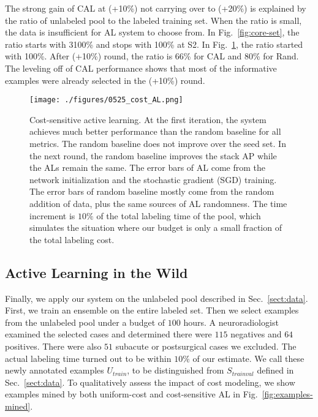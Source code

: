 \documentclass{llncs}
\begin{document}
The strong gain of CAL at (+10\%) not carrying over to (+20\%) is explained by the ratio of unlabeled pool to the labeled training set. When the ratio is small, the data is insufficient for AL system to choose from. In Fig.~\ref{fig:core-set}, the ratio starts with 3100\% and stops with 100\% at S2. In Fig.~\ref{fig:cost-sensitive}, the ratio started with 100\%. After (+10\%) round, the ratio is 66\% for CAL and 80\% for Rand. The leveling off of CAL performance shows that most of the informative examples were already selected in the (+10\%) round. 


\begin{figure}[t]
    \centering
    \texttt{[image: ./figures/0525\_cost\_AL.png]}
    \vspace*{-0.3cm}
    \caption{Cost-sensitive active learning. At the first iteration, the system achieves much better performance than the random baseline for all metrics. The random baseline does not improve over the seed set. In the next round, the random baseline improves the stack AP while the ALs remain the same. The error bars of AL come from the network initialization and the stochastic gradient (SGD) training. The error bars of random baseline mostly come from the random addition of data, plus the same sources of AL randomness. The time increment is $10\%$ of the total labeling time of the pool, which simulates the situation where our budget is only a small fraction of the total labeling cost.}
    \label{fig:cost-sensitive}
    \vspace*{-0.05cm}
\end{figure}

\subsection{Active Learning in the Wild}
\vspace*{-0.05cm}

Finally, we apply our system on the unlabeled pool described in Sec.~\ref{sect:data}. First, we train an ensemble on the entire labeled set. Then we select examples from the unlabeled pool under a budget of $100$ hours. A neuroradiologist examined the selected cases and determined there were $115$ negatives and $64$ positives. There were also $51$ subacute or postsurgical cases we excluded. The actual labeling time turned out to be within $10\%$ of our estimate. We call these newly annotated examples $U_{train}$, to be distinguished from $S_{trainval}$ defined in Sec.~\ref{sect:data}. To qualitatively assess the impact of cost modeling, we show examples mined by both uniform-cost and cost-sensitive AL in Fig.~\ref{fig:examples-mined}.
\end{document}
